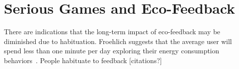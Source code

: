 \documentclass{sigchi}
\newcommand{\Hawaii}{Hawai`i\xspace}
\begin{document}




\section{Serious Games and Eco-Feedback}

There are indications that the long-term impact of eco-feedback may be diminished due to habituation. Froehlich suggests that the average user will spend less than one minute per day exploring their energy consumption behaviors~\cite{Froehlich2010-BECC}. People habituate to feedback [citations?]
\end{document}
